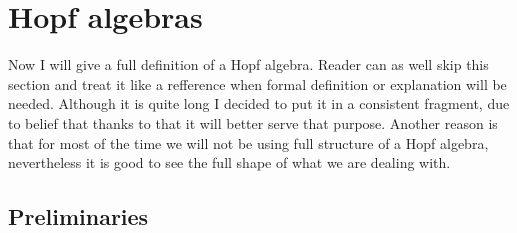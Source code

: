 \documentclass[a4paper, 12pt]{article}
\begin{document}
\section{Hopf algebras}
Now I will give a full definition of a Hopf algebra.
Reader can as well skip this section and treat it like a refference when formal definition or explanation
will be needed. Although it is quite long I decided to put it in a consistent fragment, due to belief
that thanks to that it will better serve that purpose.
Another reason is that for most of the time we will not be using full structure of a Hopf algebra,
nevertheless it is good
to see the full shape of what we are dealing with. \\
\subsection{Preliminaries}
\end{document}
